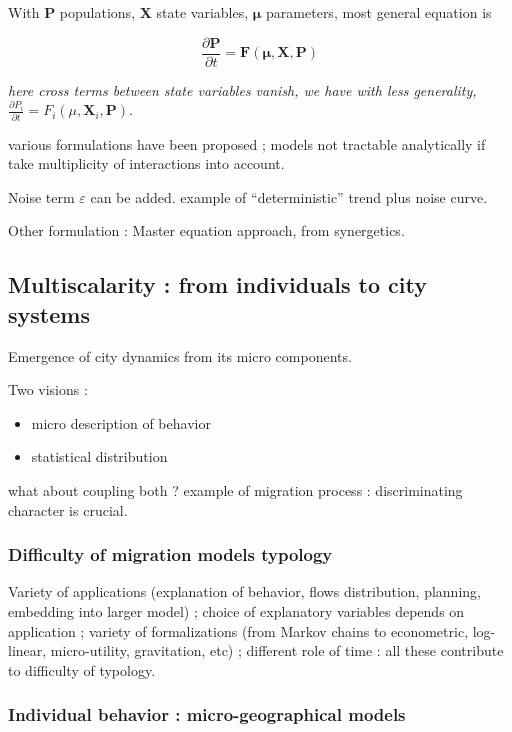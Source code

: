 With $\mathbf{P}$ populations, $\mathbf{X}$ state variables, $\mathbf{\mu}$ parameters, most general equation is

\[
\frac{\partial \mathbf{P}}{\partial t} = \mathbf{F}(\mathbf{\mu},\mathbf{X},\mathbf{P})
\]

\textit{here cross terms between state variables vanish, we have with less generality,} $\frac{\partial P_i}{\partial t} = F_i(\mu, \mathbf{X}_i,\mathbf{P})$.

various formulations have been proposed ; models not tractable analytically if take multiplicity of interactions into account.

Noise term $\varepsilon$ can be added. example of ``deterministic'' trend plus noise curve.

Other formulation : Master equation approach, from synergetics.


\subsection{Multiscalarity : from individuals to city systems}

Emergence of city dynamics from its micro components.

Two visions :
\begin{itemize}
\item micro description of behavior
\item statistical distribution
\end{itemize}

what about coupling both ? example of migration process : discriminating character is crucial.

\subsubsection{Difficulty of migration models typology}

Variety of applications (explanation of behavior, flows distribution, planning, embedding into larger model) ; choice of explanatory variables depends on application ; variety of formalizations (from Markov chains to econometric, log-linear, micro-utility, gravitation, etc) ; different role of time : all these contribute to difficulty of typology.

\subsubsection{Individual behavior : micro-geographical models}

